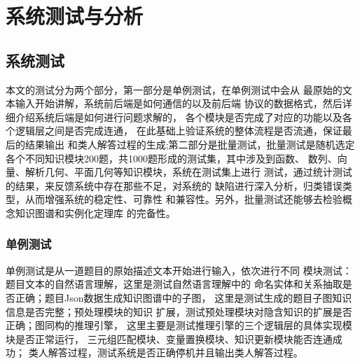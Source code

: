 \documentclass{standalone}
\begin{document}
	
\chapter{系统测试与分析}
\section{系统测试}
本文的测试分为两个部分，第一部分是单例测试，在单例测试中会从
最原始的文本输入开始讲解，系统前后端是如何通信的以及前后端
协议的数据格式，然后详细介绍系统后端是如何进行问题求解的，
各个模块是否完成了对应的功能以及各个逻辑层之间是否完成连通，
在此基础上验证系统的整体流程是否流通，保证最后的结果输出
和类人解答过程的生成;第二部分是批量测试，批量测试是随机选定
各个不同知识模块200题，共1000题形成的测试集，其中涉及到函数、
数列、向量、解析几何、平面几何等知识模块，系统在测试集上进行
测试，通过统计测试的结果，来反馈系统中存在那些不足，对系统的
缺陷进行深入分析，归类错误类型，从而增强系统的稳定性、可靠性
和兼容性。另外，批量测试还能够去检验概念知识图谱和实例化定理库
的完备性。
\subsection{单例测试}
单例测试是从一道题目的原始描述文本开始进行输入，依次进行不同
模块测试：题目文本的自然语言理解，这里是测试自然语言理解中的
命名实体和关系抽取是否正确；题目Json数据生成知识图谱中的子图，
这里是测试生成的题目子图知识信息是否完整；预处理模块的知识
扩展，测试预处理模块对隐含知识的扩展是否正确；图同构的推理引擎，
这里主要是测试推理引擎的三个逻辑层的具体实现模块是否正常运行，
三元组匹配模块、变量置换模块、知识更新模块能否连通成功；
类人解答过程，测试系统是否正确停机并且输出类人解答过程。
\end{document}

